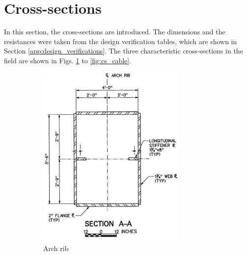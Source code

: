 \section{Cross-sections} \label{app:cross_sections}
In this section, the cross-sections are introduced. The dimensions and the resistances were taken from the design verification tables, which are shown in Section \ref{app:design_verifications}. The three characteristic cross-sections in the field are shown in Figs. \ref{fig:cs_arch} to \ref{fig:cs_cable}. 
\begin{figure}[H]
\centering
\begin{subfigure}{0.33\textwidth}
    \centering
    \vspace*{0.68cm}
    \includegraphics[width=0.8\textwidth]{overleaf/Appendix/Pictures/arch_3.PNG}
    \vspace*{0.68cm}
    \caption{Arch rib}
    \label{fig:cs_arch}
\end{subfigure}%
\begin{subfigure}{.33\textwidth}
    \centering

\end{subfigure}
\end{figure}

